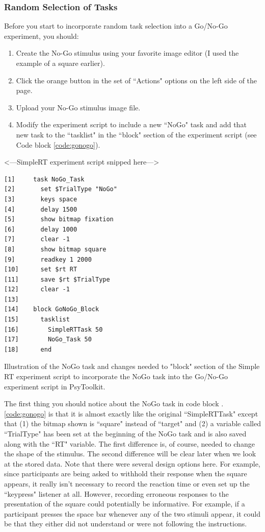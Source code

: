 \subsubsection{Random Selection of Tasks}
Before you start to incorporate random task selection into a Go/No-Go experiment, you should:
\begin{enumerate}\item Create the No-Go stimulus using your favorite image editor (I used the example of a square earlier).
\item Click the orange  button in the set of ``Actions" options on the left side of the page.
\item Upload your No-Go stimulus image file.
\item Modify the experiment script to include a new ``NoGo" task and add that new task to the ``tasklist" in the ``block" section of the experiment script (see
Code block \ref{code:gonogo}). 
\end{enumerate}
\begin{tcolorbox}[every float=\centering, drop shadow,     title=The Go/No-Go Experiment Script]
\begin{center}<---SimpleRT experiment script snipped here--->\end{center}
\begin{verbatim}
[1]     task NoGo_Task
[2]       set $TrialType "NoGo"
[3]       keys space
[4]       delay 1500
[5]       show bitmap fixation
[6]       delay 1000
[7]       clear -1
[8]       show bitmap square
[9]       readkey 1 2000
[10]      set $rt RT
[11]      save $rt $TrialType
[12]      clear -1
[13]
[14]    block GoNoGo_Block
[15]      tasklist
[16]        SimpleRTTask 50
[17]        NoGo_Task 50
[18]      end
    \end{verbatim}
\tcblower
\begin{codeblock}{Illustration of the NoGo task and changes needed to "block" section of the Simple RT experiment script to incorporate the NoGo task into the Go/No-Go experiment script in PsyToolkit.}\label{code:gonogo}\end{codeblock}
\end{tcolorbox}

The first thing you should notice about the NoGo task in code block \thechapter.\ref{code:gonogo} is that it is almost exactly like the original ``SimpleRTTask" except that (1) the bitmap shown is ``square" instead of ``target" and (2) a variable called ``TrialType" has been set at the beginning of the NoGo task and is also saved along with the ``RT" variable.  The first difference is, of course, needed to change the shape of the stimulus.  The second difference will be clear later when we look at the stored data.  Note that there were several design options here.  For example, since participants are being asked to withhold their response when the square appears, it really isn't necessary to record the reaction time or even set up the ``keypress" listener at all.  However, recording erroneous responses to the presentation of the square could potentially be informative.  For example, if a participant presses the space bar whenever any of the two stimuli appear, it could be that they either did not understand or were not following the instructions.

